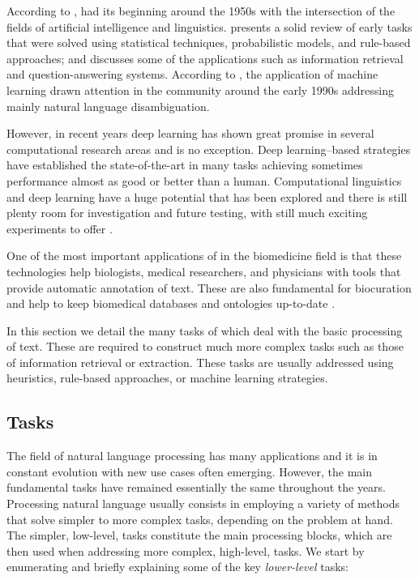 According to \textcite{nadkarni2011a},  had its beginning around the 1950s with the intersection of the fields of artificial intelligence and linguistics.
\textcite{rindflesch1996a} presents a solid review of early  tasks that were solved using statistical techniques, probabilistic models, and rule-based approaches; and discusses some of the  applications such as information retrieval and question-answering systems.
According to \textcite{marquez2000a}, the application of machine learning drawn attention in the  community around the early 1990s addressing mainly natural language disambiguation.

However, in recent years deep learning has shown great promise in several computational research areas and  is no exception.
Deep learning--based strategies have established the state-of-the-art in many tasks achieving sometimes performance almost as good or better than a human.
Computational linguistics and deep learning have a huge potential that has been explored and there is still plenty room for investigation and future testing, with still much exciting experiments to offer \parencite{manning2015a}.

One of the most important applications of  in the biomedicine field is that these technologies help biologists, medical researchers, and physicians with tools that provide automatic annotation of text.
These are also fundamental for biocuration and help to keep biomedical databases and ontologies up-to-date \parencite{singhal2016b}.

In this section we detail the many tasks of  which deal with the basic processing of text. These are required to construct much more complex tasks such as those of information retrieval or extraction. These tasks are usually addressed using heuristics, rule-based approaches, or machine learning strategies.


\subsection{Tasks}

The field of natural language processing has many applications and it is in constant evolution with new use cases often emerging.
However, the main fundamental  tasks have remained essentially the same throughout the years.
Processing natural language usually consists in employing a variety of methods that solve simpler to more complex tasks, depending on the problem at hand.
The simpler, low-level, tasks constitute the main processing blocks, which are then used when addressing more complex, high-level, tasks.
We start by enumerating and briefly explaining some of the key \textit{lower-level}  tasks:

